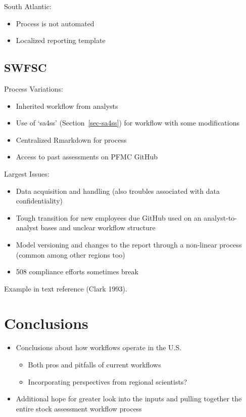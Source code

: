 \documentclass[
  letterpaper,
  oneside,
  open=any]{scrbook}
\begin{document}
South Atlantic:

\begin{itemize}
\item
  Process is not automated
\item
  Localized reporting template
\end{itemize}

\section{SWFSC}\label{sec-swfsc}

Process Variations:

\begin{itemize}
\item
  Inherited workflow from analysts
\item
  Use of `sa4ss' (Section~\ref{sec-sa4ss}) for workflow with some
  modifications
\item
  Centralized Rmarkdown for process
\item
  Access to past assessments on PFMC GitHub
\end{itemize}

Largest Issues:

\begin{itemize}
\item
  Data acquisition and handling (also troubles associated with data
  confidentiality)
\item
  Tough transition for new employees due GitHub used on an
  analyst-to-analyst bases and unclear workflow structure
\item
  Model versioning and changes to the report through a non-linear
  process (common among other regions too)
\item
  508 compliance efforts sometimes break
\end{itemize}

Example in text reference (Clark 1993).


\chapter{Conclusions}\label{conclusions}

\begin{itemize}
\item
  Conclusions about how workflows operate in the U.S.

  \begin{itemize}
  \item
    Both pros and pitfalls of current workflows
  \item
    Incorporating perspectives from regional scientists?
  \end{itemize}
\item
  Additional hope for greater look into the inputs and pulling together
  the entire stock assessment workflow process
\end{itemize}
\end{document}
